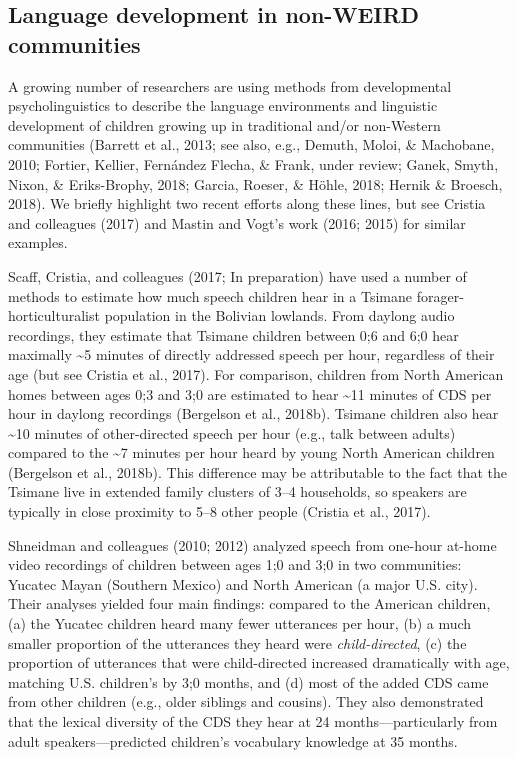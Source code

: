 \documentclass[floatsintext,man]{apa6}
\theoremstyle{definition}
\theoremstyle{definition}
\theoremstyle{definition}
\theoremstyle{remark}
\begin{document}
\subsection{Language development in non-WEIRD
communities}\label{intro-nonweird}

A growing number of researchers are using methods from developmental
psycholinguistics to describe the language environments and linguistic
development of children growing up in traditional and/or non-Western
communities (Barrett et al., 2013; see also, e.g., Demuth, Moloi, \&
Machobane, 2010; Fortier, Kellier, Fernández Flecha, \& Frank, under
review; Ganek, Smyth, Nixon, \& Eriks-Brophy, 2018; Garcia, Roeser, \&
Höhle, 2018; Hernik \& Broesch, 2018). We briefly highlight two recent
efforts along these lines, but see Cristia and colleagues (2017) and
Mastin and Vogt's work (2016; 2015) for similar examples.

Scaff, Cristia, and colleagues (2017; In preparation) have used a number
of methods to estimate how much speech children hear in a Tsimane
forager-horticulturalist population in the Bolivian lowlands. From
daylong audio recordings, they estimate that Tsimane children between
0;6 and 6;0 hear maximally \textasciitilde{}5 minutes of directly
addressed speech per hour, regardless of their age (but see Cristia et
al., 2017). For comparison, children from North American homes between
ages 0;3 and 3;0 are estimated to hear \textasciitilde{}11 minutes of
CDS per hour in daylong recordings (Bergelson et al., 2018b). Tsimane
children also hear \textasciitilde{}10 minutes of other-directed speech
per hour (e.g., talk between adults) compared to the \textasciitilde{}7
minutes per hour heard by young North American children (Bergelson et
al., 2018b). This difference may be attributable to the fact that the
Tsimane live in extended family clusters of 3--4 households, so speakers
are typically in close proximity to 5--8 other people (Cristia et al.,
2017).

Shneidman and colleagues (2010; 2012) analyzed speech from one-hour
at-home video recordings of children between ages 1;0 and 3;0 in two
communities: Yucatec Mayan (Southern Mexico) and North American (a major
U.S. city). Their analyses yielded four main findings: compared to the
American children, (a) the Yucatec children heard many fewer utterances
per hour, (b) a much smaller proportion of the utterances they heard
were \emph{child-directed}, (c) the proportion of utterances that were
child-directed increased dramatically with age, matching U.S. children's
by 3;0 months, and (d) most of the added CDS came from other children
(e.g., older siblings and cousins). They also demonstrated that the
lexical diversity of the CDS they hear at 24 months---particularly from
adult speakers---predicted children's vocabulary knowledge at 35 months.
\end{document}
